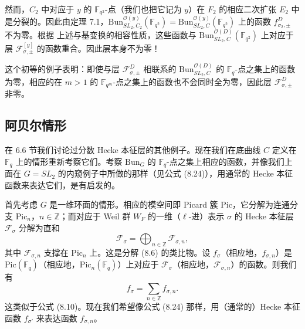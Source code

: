 \documentclass[11pt,a4paper]{article}
\newcommand{\Bun}{\mathrm{Bun}}
\begin{document}

然而，$C_2$ 中对应于 $y$ 的 $\mathbb{F}_{q^2}$-点（我们也把它记为 $y$）在 $F_2$ 的相应二次扩张 $E_2$ 中是分裂的。因此由定理 7.1，$\Bun^{\mathcal{O}(y)}_{SL_2,C_2}(\mathbb{F}_{q^2}) = \Bun^{\mathcal{O}(y)}_{SL_2,C}(\mathbb{F}_{q^2})$ 上的函数 $f^D_{\sigma_2,\pm}$ 不为零。根据
上述与基变换的相容性质，这些函数与 $\Bun^{\mathcal{O}(D)}_{SL_2,C}(\mathbb{F}_{q^2})$ 上对应于层 $\mathcal{F}^{[y]}_{\sigma,\pm}$ 的函数重合。因此层本身不为零！


这个初等的例子表明：即使与层 $\mathcal{F}^D_{\sigma,\pm}$ 相联系的 $\Bun^{\mathcal{O}(D)}_{SL_2,C}$ 的 $\mathbb{F}_q$-点之集上的函数为零，相应的在 $m > 1$ 的 $\mathbb{F}_{q^m}$-点之集上的函数也不会同时全为零，因此层 $\mathcal{F}^D_{\sigma,\pm}$ 非零。

\subsection{阿贝尔情形}

在 6.6 节我们讨论过分数 Hecke 本征层的其他例子。现在我们在底曲线 $C$ 定义在 $\mathbb{F}_q$ 上的情形重新考察它们。考察 $\Bun_G$ 的 $\mathbb{F}_q$-点之集上相应的函数，并像我们上面在 $G = SL_2$ 的内窥例子中所做的那样（见公式 (8.24)），用通常的 Hecke 本征函数来表达它们，是有启发的。

首先考虑 $G$ 是一维环面的情形。相应的模空间即 Picard 簇 $\mathrm{Pic}$，它分解为连通分支 $\mathrm{Pic}_n$，$n\in \mathbb{Z}$；而对应于 Weil 群 $W_F$ 的一维（$\ell$-进）表示 $\sigma$ 的 Hecke 本征层 $\mathcal{F}_\sigma$ 分解为直和
\begin{equation}\tag{8.25}
\mathcal{F}_\sigma = \bigoplus_{n\in\mathbb{Z}} \mathcal{F}_{\sigma,n},
\end{equation}
其中 $\mathcal{F}_{\sigma,n}$ 支撑在 $\mathrm{Pic}_n$ 上。这是分解 (8.6) 的类比物。设 $f_\sigma$（相应地，$f_{\sigma,n}$）是 $\mathrm{Pic}(\mathbb{F}_q)$（相应地，$\mathrm{Pic}_n(\mathbb{F}_q)$）上对应于 $\mathcal{F}_\sigma$（相应地，$\mathcal{F}_{\sigma,n}$）的函数。则我们有
\[
f_\sigma = \sum_{n\in\mathbb{Z}} f_{\sigma,n}.
\]
这类似于公式 (8.10)。现在我们希望像公式 (8.24) 那样，用（通常的）Hecke 本征函数 $f_{\sigma'}$ 来表达函数 $f_{\sigma,n}$。
\end{document}
